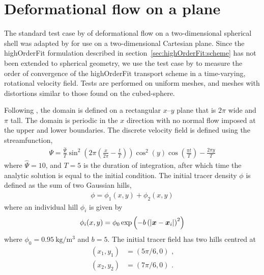 \section{Deformational flow on a plane}
\label{sec:highOrderFit:deformationPlane}

The standard test case by \citet{lauritzen2012} of deformational flow on a two-dimensional spherical shell was adapted by \citet{chen2017} for use on a two-dimensional Cartesian plane.
Since the highOrderFit formulation described in section~\ref{sec:highOrderFit:scheme} has not been extended to spherical geometry, we use the test case by \citet{chen2017} to measure the order of convergence of the highOrderFit transport scheme in a time-varying, rotational velocity field.
Tests are performed on uniform meshes, and meshes with distortions similar to those found on the cubed-sphere.

Following \citet{chen2017}, the domain is defined on a rectangular $x$--$y$ plane that is $2\pi$ wide and $\pi$ tall.  The domain is periodic in the $x$ direction with no normal flow imposed at the upper and lower boundaries.
The discrete velocity field is defined using the streamfunction,
\begin{align}
	\Psi = \frac{\hat{\Psi}}{T} \sin^2 \left( 2 \pi \left( \frac{x}{2\pi} - \frac{t}{T} \right) \right) \cos^2(y) \cos \left( \frac{\pi t}{T} \right) - \frac{2\pi y}{T}
\end{align}
where $\hat{\Psi} = 10$, and $T = 5$ is the duration of integration, after which time the analytic solution is equal to the initial condition.
The initial tracer density $\phi$ is defined as the sum of two Gaussian hills,
\begin{align}
	\phi = \phi_1(x,y) + \phi_2(x,y)
\end{align}
where an individual hill $\phi_i$ is given by
\begin{align}
	\phi_i(x,y) = \phi_0 \exp \left( -b \left( \left\lvert \bm{x} - \bm{x}_i \right\rvert \right)^2 \right)
\end{align}
where $\phi_0 = \SI{0.95}{\kilo\gram\per\meter\cubed}$ and $b = 5$.
The initial tracer field has two hills centred at 
\begin{align}
	(x_1,y_1) &= (5 \pi /6, 0) \text{ ,} \\
	(x_2,y_2) &= (7 \pi /6, 0) \text{ .}
\end{align}

